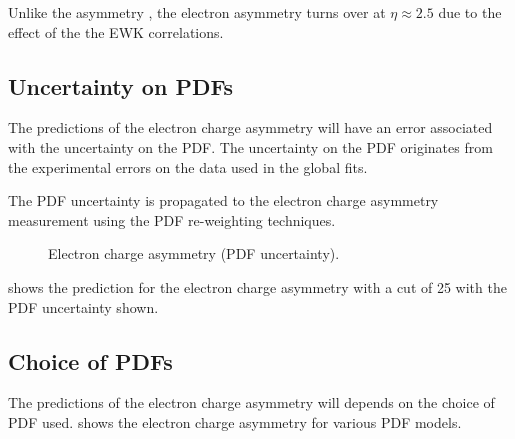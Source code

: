 Unlike the \PW asymmetry , the electron asymmetry turns over at $\eta\approx
2.5$ due to the effect of the the \ac{EWK} correlations.

\subsection{Uncertainty on \acp{PDF}}

The predictions of the electron charge asymmetry will have an error associated
with the uncertainty on the \ac{PDF}.
The uncertainty on the \ac{PDF} originates from the experimental errors on the
data used in the global fits.

The \ac{PDF} uncertainty is propagated to the electron charge asymmetry
measurement using the \ac{PDF} re-weighting techniques\cite{}.

\begin{figure}[htb]
  \centering
  \caption{Electron charge asymmetry (PDF uncertainty).}
  \label{wbos:asym_pdfuncert}
\end{figure}

 shows the prediction for the electron charge
asymmetry with a \PT cut of \unit{25}{\GeV} with the \ac{PDF} uncertainty shown.




\subsection{Choice of \acp{PDF}}

The predictions of the electron charge asymmetry will depends on the choice of
\ac{PDF} used. 
 shows the electron charge asymmetry for
various \ac{PDF} models.

